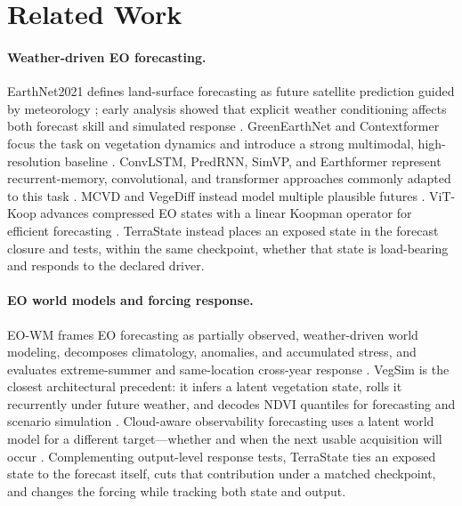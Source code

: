 \documentclass[letterpaper]{article} %
\begin{document}
\section{Related Work}

\paragraph{Weather-driven EO forecasting.}
EarthNet2021 defines land-surface forecasting as future satellite prediction guided by meteorology \cite{requenamesa2021earthnet}; early analysis showed that explicit weather conditioning affects both forecast skill and simulated response \cite{diaconu2022weather}. GreenEarthNet and Contextformer focus the task on vegetation dynamics and introduce a strong multimodal, high-resolution baseline \cite{benson2024multimodal}. ConvLSTM, PredRNN, SimVP, and Earthformer represent recurrent-memory, convolutional, and transformer approaches commonly adapted to this task \cite{shi2015convlstm,wang2017predrnn,gao2022simvp,gao2022earthformer}. MCVD and VegeDiff instead model multiple plausible futures \cite{voleti2022mcvd,zhao2024vegediff}. ViT-Koop advances compressed EO states with a linear Koopman operator for efficient forecasting \cite{shinohara2025vitkoop}. TerraState instead places an exposed state in the forecast closure and tests, within the same checkpoint, whether that state is load-bearing and responds to the declared driver.

\paragraph{EO world models and forcing response.}
EO-WM frames EO forecasting as partially observed, weather-driven world modeling, decomposes climatology, anomalies, and accumulated stress, and evaluates extreme-summer and same-location cross-year response \cite{luo2026eowm}. VegSim is the closest architectural precedent: it infers a latent vegetation state, rolls it recurrently under future weather, and decodes NDVI quantiles for forecasting and scenario simulation \cite{iele2026vegsim}. Cloud-aware observability forecasting uses a latent world model for a different target---whether and when the next usable acquisition will occur \cite{albughdadi2026observability}. Complementing output-level response tests, TerraState ties an exposed state to the forecast itself, cuts that contribution under a matched checkpoint, and changes the forcing while tracking both state and output.
\end{document}
